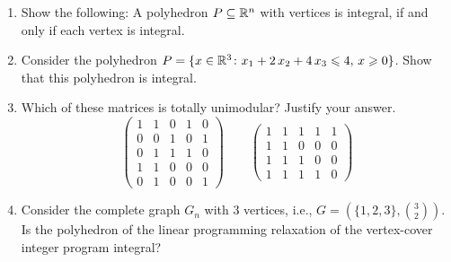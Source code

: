 \begin{enumerate}
\item Show the following: A polyhedron $P \subseteq\mathbb{R}^n$ with vertices is
  integral, if and only if each vertex is integral. \label{i:item:3}
\item Consider the polyhedron $P = \{ x \in \mathbb{R}^3 \colon x_1 + 2\,x_2 + 4\,
  x_3 \leqslant 4, \, x\geqslant0\}$. Show that this polyhedron is
  integral. \label{i:item:2}
\item Which of these matrices is totally unimodular? Justify your
  answer. \label{i:item:4}
  \begin{displaymath}
    \begin{pmatrix}
      1 & 1  & 0 &  1 & 0 \\
      0 & 0 &  1 &  0 &  1 \\
      0 & 1 &  1 &  1 & 0 \\
      1 & 1 &  0 &  0 & 0 \\
      0 & 1 &  0 &  0 & 1
    \end{pmatrix}
    \quad \quad 
    \begin{pmatrix}
      1&  1& 1& 1& 1 \\
      1& 1& 0& 0& 0\\
      1& 1& 1& 0& 0\\
      1&  1& 1& 1& 0
    \end{pmatrix}
  \end{displaymath}
\item Consider the complete graph $G_n$ with $3$ vertices, i.e., $G =
  (\{1,2,3\}, \binom{3}{2} )$. Is the polyhedron of the linear
  programming relaxation of the vertex-cover integer program integral?
  \label{i:item:5} 
\end{enumerate}




% 

% 



